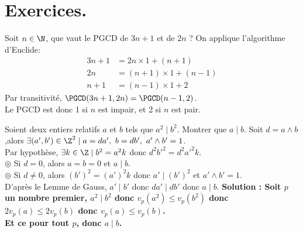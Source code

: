 \documentclass[11pt]{article}
\begin{document}
\section{Exercices.}

\begin{exercice}{}{}
    Soit $n\in\N$, que vaut le PGCD de $3n+1$ et de $2n$ ?
    \tcblower
    On applique l'algorithme d'Euclide:
    \begin{align*}
        3n+1 &= 2n\times1+(n+1)\\
        2n &= (n+1)\times1+(n-1)\\
        n+1 &= (n-1)\times1+2
    \end{align*}
    Par transitivité, $\PGCD(3n+1,2n)=\PGCD(n-1,2)$.\\
    Le PGCD est donc 1 si $n$ est impair, et 2 si $n$ est pair.
\end{exercice}

\begin{exercice}{}{}
    Soient deux entiers relatifs $a$ et $b$ tels que $a^2\mid b^2$. Montrer que $a\mid b$.
    \tcblower
    Soit $d=a\land b$ ,alors $\exists (a',b')\in\Z^2\mid a=da',~b=db',~a'\land b'=1$.\\
    Par hypothèse, $\exists k \in \Z \mid b^2=a^2k$ donc $d^2{b'}^2=d^2{a'}^2k$.\\
    $\circledcirc$ Si $d=0$, alors $a=b=0$ et $a\mid b$.\\
    $\circledcirc$ Si $d\neq 0$, alors $(b')^2=(a')^2k$ donc $a'\mid(b')^2$ et $a'\land b'=1$.\\
    D'après le Lemme de Gauss, $a'\mid b'$ donc $da'\mid db'$ donc $a\mid b$.\n
    \bf{Solution :}\n
    Soit $p$ un nombre premier, $a^2\mid b^2$ donc $v_p(a^2)\leq v_p(b^2)$ donc $2v_p(a)\leq2v_p(b)$ donc $v_p(a)\leq v_p(b)$.\\
    Et ce pour tout $p$, donc $a\mid b$.
\end{exercice}
\end{document}
